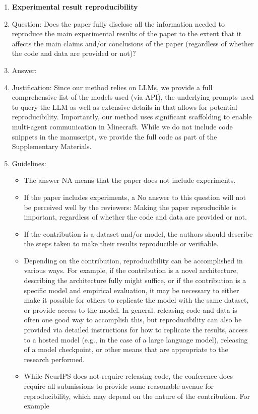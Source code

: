 \documentclass{article}
\begin{document}
\begin{enumerate}
    \item {\bf Experimental result reproducibility}
    \item[] Question: Does the paper fully disclose all the information needed to reproduce the main experimental results of the paper to the extent that it affects the main claims and/or conclusions of the paper (regardless of whether the code and data are provided or not)?
    \item[] Answer: \answerYes{}
    \item[] Justification: Since our method relies on LLMs, we provide a full comprehensive list of the models used (via API), the underlying prompts used to query the LLM as well as extensive details in  that allows for potential reproducibility. Importantly, our method uses significant scaffolding to enable multi-agent communication in Minecraft. While we do not include code snippets in the manuscript, we provide the full code as part of the Supplementary Materials.
    \item[] Guidelines:
    \begin{itemize}
        \item The answer NA means that the paper does not include experiments.
        \item If the paper includes experiments, a No answer to this question will not be perceived well by the reviewers: Making the paper reproducible is important, regardless of whether the code and data are provided or not.
        \item If the contribution is a dataset and/or model, the authors should describe the steps taken to make their results reproducible or verifiable. 
        \item Depending on the contribution, reproducibility can be accomplished in various ways. For example, if the contribution is a novel architecture, describing the architecture fully might suffice, or if the contribution is a specific model and empirical evaluation, it may be necessary to either make it possible for others to replicate the model with the same dataset, or provide access to the model. In general. releasing code and data is often one good way to accomplish this, but reproducibility can also be provided via detailed instructions for how to replicate the results, access to a hosted model (e.g., in the case of a large language model), releasing of a model checkpoint, or other means that are appropriate to the research performed.
        \item While NeurIPS does not require releasing code, the conference does require all submissions to provide some reasonable avenue for reproducibility, which may depend on the nature of the contribution. For example

\end{itemize}
\end{enumerate}
\end{document}
